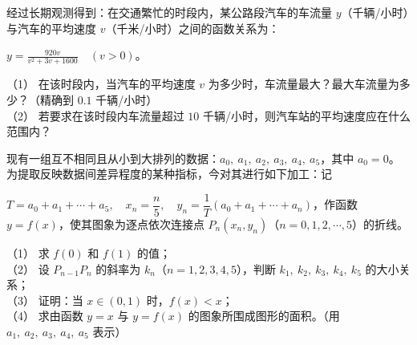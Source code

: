\begin{question}

经过长期观测得到：在交通繁忙的时段内，某公路段汽车的车流量 $y$（千辆/小时）与汽车的平均速度 $v$（千米/小时）之间的函数关系为：

$\displaystyle y=\frac{920v}{v^2+3v+1600}\quad(v>0)$。

（1） 在该时段内，当汽车的平均速度 $v$ 为多少时，车流量最大？最大车流量为多少？（精确到 $0.1$ 千辆/小时）\\
（2） 若要求在该时段内车流量超过 $10$ 千辆/小时，则汽车站的平均速度应在什么范围内？

\end{question}
\begin{question}

现有一组互不相同且从小到大排列的数据：$a_0,\ a_1,\ a_2,\ a_3,\ a_4,\ a_5$，其中 $a_0=0$。为提取反映数据间差异程度的某种指标，今对其进行如下加工：记

$T=a_0+a_1+\cdots+a_5,\quad x_n=\dfrac n5,\quad y_n=\dfrac1T(a_0+a_1+\cdots+a_n)$，作函数 $y=f(x)$，使其图象为逐点依次连接点 $P_n(x_n,y_n)$（$n=0,1,2,\cdots,5$）的折线。

（1） 求 $f(0)$ 和 $f(1)$ 的值；\\
（2） 设 $P_{n-1}P_n$ 的斜率为 $k_n$（$n=1,2,3,4,5$），判断 $k_1,\ k_2,\ k_3,\ k_4,\ k_5$ 的大小关系；\\
（3） 证明：当 $x\in(0,1)$ 时，$f(x)<x$；\\
（4） 求由函数 $y=x$ 与 $y=f(x)$ 的图象所围成图形的面积。（用 $a_1,\ a_2,\ a_3,\ a_4,\ a_5$ 表示）

\end{question}